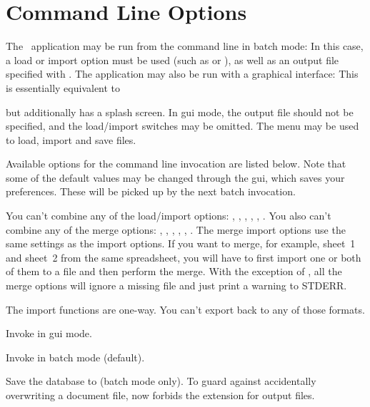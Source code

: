 \section{Command Line Options}
\label{sec:commandoptions}

The \appname\ application may be run from the command line in batch
mode:
In this case, a load or import option must be used (such as
 or ), as well as an output file specified
with . The application may also be run with a
graphical interface:
This is essentially equivalent to
\begin{terminal}
  
\end{terminal}
but additionally has a splash screen. In \gls{gui} mode, the output
file should not be specified, and the load\slash import switches may
be omitted. The  menu may be used to load, import and
save files.

Available options for the command line invocation are listed below.
Note that some of the default values may be changed through the
\gls{gui}, which saves your preferences.  These will be picked up by
the next batch invocation.

You can't combine any of the load/import options: ,
, , , ,
. You also can't combine any of the merge options:
, , ,
, , .
The merge import options use the same settings as the import
options. If you want to merge, for example, sheet~1 and sheet~2 from
the same spreadsheet, you will have to first import one or both of
them to a  file and then perform the merge.  With the
exception of , all the merge options will ignore a
missing file and just print a warning to STDERR.

The import functions are one-way. You can't export back to any of 
those formats.

Invoke  in \gls{gui} mode.

Invoke  in batch mode (default).

Save the database to  (batch mode only).
To guard against accidentally overwriting a document file, 
now forbids the  extension for output files.


